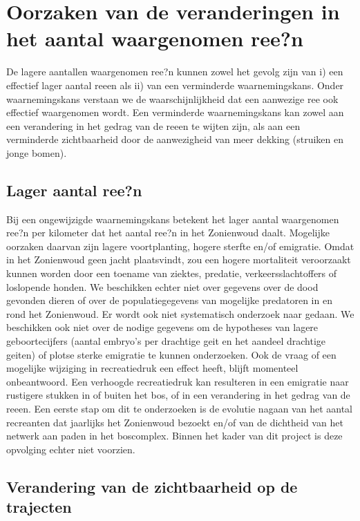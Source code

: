 \documentclass[twoside]{extreport}
\begin{document}
\section{Oorzaken van de veranderingen in het aantal waargenomen
ree?n}\label{oorzaken-van-de-veranderingen-in-het-aantal-waargenomen-reen}

De lagere aantallen waargenomen ree?n kunnen zowel het gevolg zijn van
i) een effectief lager aantal reeen als ii) van een verminderde
waarnemingskans. Onder waarnemingskans verstaan we de waarschijnlijkheid
dat een aanwezige ree ook effectief waargenomen wordt. Een verminderde
waarnemingskans kan zowel aan een verandering in het gedrag van de reeen
te wijten zijn, als aan een verminderde zichtbaarheid door de
aanwezigheid van meer dekking (struiken en jonge bomen).

\subsection{Lager aantal ree?n}\label{lager-aantal-reen}

Bij een ongewijzigde waarnemingskans betekent het lager aantal
waargenomen ree?n per kilometer dat het aantal ree?n in het Zonienwoud
daalt. Mogelijke oorzaken daarvan zijn lagere voortplanting, hogere
sterfte en/of emigratie. Omdat in het Zonienwoud geen jacht plaatsvindt,
zou een hogere mortaliteit veroorzaakt kunnen worden door een toename
van ziektes, predatie, verkeersslachtoffers of loslopende honden. We
beschikken echter niet over gegevens over de dood gevonden dieren of
over de populatiegegevens van mogelijke predatoren in en rond het
Zonienwoud. Er wordt ook niet systematisch onderzoek naar gedaan. We
beschikken ook niet over de nodige gegevens om de hypotheses van lagere
geboortecijfers (aantal embryo's per drachtige geit en het aandeel
drachtige geiten) of plotse sterke emigratie te kunnen onderzoeken. Ook
de vraag of een mogelijke wijziging in recreatiedruk een effect heeft,
blijft momenteel onbeantwoord. Een verhoogde recreatiedruk kan
resulteren in een emigratie naar rustigere stukken in of buiten het bos,
of in een verandering in het gedrag van de reeen. Een eerste stap om dit
te onderzoeken is de evolutie nagaan van het aantal recreanten dat
jaarlijks het Zonienwoud bezoekt en/of van de dichtheid van het netwerk
aan paden in het boscomplex. Binnen het kader van dit project is deze
opvolging echter niet voorzien.

\subsection{Verandering van de zichtbaarheid op de
trajecten}\label{verandering-van-de-zichtbaarheid-op-de-trajecten}
\end{document}
